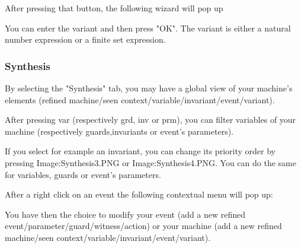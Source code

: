 After pressing that button, the following wizard will pop up


You can enter the variant and then press "OK". The variant is either a natural number expression or a finite set expression. 

\subsubsection{Synthesis}

By selecting the "Synthesis" tab, you may have a global view of your machine's elements (refined machine/seen context/variable/invariant/event/variant).


After pressing var (respectively grd, inv or prm), you can filter variables of your machine (respectively guards,invariants or event's parameters).

If you select for example an invariant, you can change its priority order by pressing Image:Synthesis3.PNG‎ or Image:Synthesis4.PNG‎. You can do the same for variables, guards or event's parameters.

After a right click on an event the following contextual menu will pop up:


You have then the choice to modify your event (add a new refined event/parameter/guard/witness/action) or your machine (add a new refined machine/seen context/variable/invariant/event/variant).

